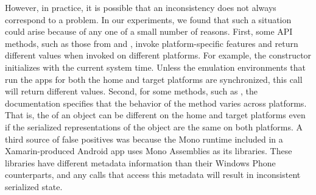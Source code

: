 However, in practice, it is possible that an inconsistency does not always
correspond to a problem. In our experiments, we found that such a situation
could arise because of any one of a small number of reasons.  First, some API
methods, such as those from  and , invoke
platform-specific features and return different values when invoked on
different platforms. For example, the  constructor
initializes  with the current system time. Unless the
emulation environments that run the apps for both the home and target platforms
are synchronized, this call will return different values.  Second, for some
methods, such as , the documentation specifies that
the behavior of the method varies across platforms. That is, the
 of an object can be different on the home and target platforms
even if the serialized representations of the object are the same on both
platforms. A third source of false positives was because the Mono runtime
included in a Xamarin-produced Android app uses Mono Assemblies as its
libraries. These libraries have different metadata information than their
Windows Phone counterparts, and any calls that access this metadata will result
in inconsistent serialized state.

